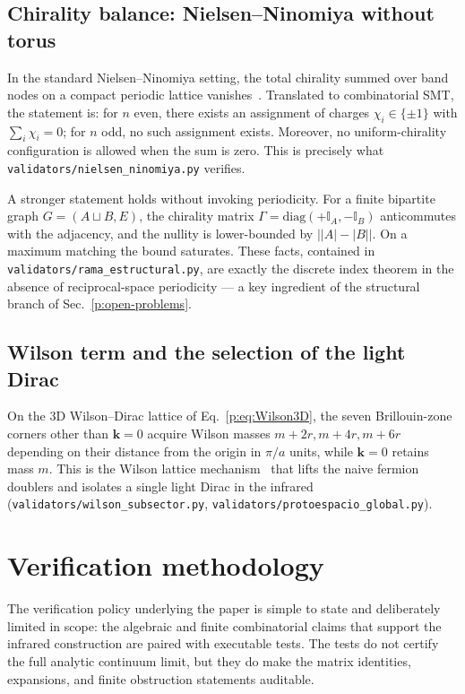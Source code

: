 \documentclass[a4paper,onecolumn,11pt]{quantumarticle}
\newcommand{\bbI}{\ensuremath{\mathbb{I}}}
\def\vk{\ensuremath{\bm{k}}}
\begin{document}
\subsection{Chirality balance: Nielsen--Ninomiya without torus}
In the standard Nielsen--Ninomiya setting, the total chirality summed over band
nodes on a compact periodic lattice vanishes~\cite{NielsenNinomiya1981a,NielsenNinomiya1981b}. Translated to combinatorial SMT, the statement is: for
$n$ even, there exists an assignment of charges $\chi_{i}\in\{\pm 1\}$
with $\sum_{i}\chi_{i}=0$; for $n$ odd, no such assignment exists.
Moreover, no uniform-chirality configuration is allowed when the sum is
zero. This is precisely what
\texttt{validators/nielsen\_ninomiya.py} verifies.

A stronger statement holds without invoking periodicity. For a finite
bipartite graph $G=(A\sqcup B,E)$, the chirality matrix
$\Gamma=\mathrm{diag}(+\bbI_{A},-\bbI_{B})$ anticommutes with the
adjacency, and the nullity is lower-bounded by $\lvert\lvert A\rvert-\lvert B\rvert\rvert$. On
a maximum matching the bound saturates. These facts, contained in
\texttt{validators/rama\_estructural.py}, are exactly the discrete index
theorem in the absence of reciprocal-space periodicity --- a key
ingredient of the structural branch of Sec.~\ref{p:open-problems}.

\subsection{Wilson term and the selection of the light Dirac}
On the 3D Wilson--Dirac lattice of Eq.~\eqref{p:eq:Wilson3D}, the
seven Brillouin-zone corners other than $\vk=0$ acquire Wilson masses
$m+2r, m+4r, m+6r$ depending on their distance from the origin in $\pi/a$
units, while $\vk=0$ retains mass $m$. This is the Wilson lattice mechanism~\cite{Wilson1974}
that lifts the naive fermion doublers and isolates a single light Dirac
in the infrared (\texttt{validators/wilson\_subsector.py},
\texttt{validators/protoespacio\_global.py}).


\section{Verification methodology}
\label{p:verification}

The verification policy underlying the paper is simple to state and deliberately limited in scope: the algebraic and finite combinatorial claims that support the infrared construction are paired with executable tests. The tests do not certify the full analytic continuum limit, but they do make the matrix identities, expansions, and finite obstruction statements auditable.
\end{document}
